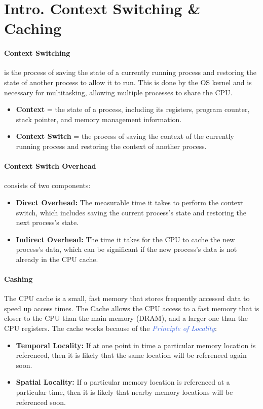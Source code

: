 \documentclass[openany,12pt]{book}
\newcommand{\blue}[1]{\textcolor{RoyalBlue}{#1}}
\begin{document}
\newpage
\section*{Intro. Context Switching \& Caching}
\paragraph{Context Switching} is the process of saving the state of a currently running process and restoring the state of another process to allow it to run. This is done by the OS kernel and is necessary for multitasking, allowing multiple processes to share the CPU.
\begin{itemize}
  \item \textbf{Context} = the state of a process, including its registers, program counter, stack pointer, and memory management information.
  \item \textbf{Context Switch} = the process of saving the context of the currently running process and restoring the context of another process.
\end{itemize}

\paragraph{Context Switch Overhead} consists of two components:
\begin{itemize}
  \item \textbf{Direct Overhead:} The measurable time it takes to perform the context switch, which includes saving the current process's state and restoring the next process's state.
  \item \textbf{Indirect Overhead:} The time it takes for the CPU to cache the new process's data, which can be significant if the new process's data is not already in the CPU cache.
\end{itemize}

\paragraph{Cashing} The CPU cache is a small, fast memory that stores frequently accessed data to speed up access times. The Cache allows the CPU access to a fast memory that is closer to the CPU than the main memory (DRAM), and a larger one than the CPU registers. The cache works because of the \blue{\textit{Principle of Locality}}:
\begin{itemize}
  \item \textbf{Temporal Locality:} If at one point in time a particular memory location is referenced, then it is likely that the same location will be referenced again soon.
  \item \textbf{Spatial Locality:} If a particular memory location is referenced at a particular time, then it is likely that nearby memory locations will be referenced soon.
\end{itemize}
\end{document}
